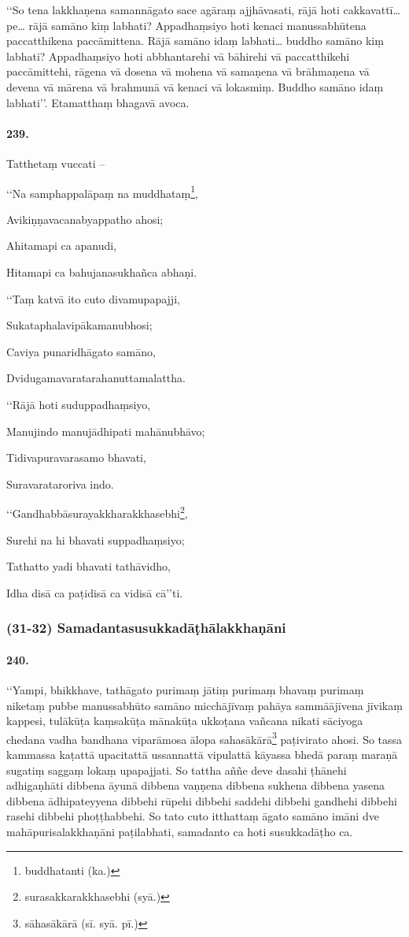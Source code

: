 ‘‘So tena lakkhaṇena samannāgato sace agāraṃ ajjhāvasati, rājā hoti cakkavattī…pe… rājā samāno kiṃ labhati? Appadhaṃsiyo hoti kenaci manussabhūtena paccatthikena paccāmittena. Rājā samāno idaṃ labhati… buddho samāno kiṃ labhati? Appadhaṃsiyo hoti abbhantarehi vā bāhirehi vā paccatthikehi paccāmittehi, rāgena vā dosena vā mohena vā samaṇena vā brāhmaṇena vā devena vā mārena vā brahmunā vā kenaci vā lokasmiṃ. Buddho samāno idaṃ labhati’’. Etamatthaṃ bhagavā avoca.

\paragraph{239.} Tatthetaṃ vuccati –

‘‘Na samphappalāpaṃ na muddhataṃ\footnote{buddhatanti (ka.)},

Avikiṇṇavacanabyappatho ahosi;

Ahitamapi ca apanudi,

Hitamapi ca bahujanasukhañca abhaṇi.

‘‘Taṃ katvā ito cuto divamupapajji,

Sukataphalavipākamanubhosi;

Caviya punaridhāgato samāno,

Dvidugamavaratarahanuttamalattha.

‘‘Rājā hoti suduppadhaṃsiyo,

Manujindo manujādhipati mahānubhāvo;

Tidivapuravarasamo bhavati,

Suravarataroriva indo.

‘‘Gandhabbāsurayakkharakkhasebhi\footnote{surasakkarakkhasebhi (syā.)},

Surehi na hi bhavati suppadhaṃsiyo;

Tathatto yadi bhavati tathāvidho,

Idha disā ca paṭidisā ca vidisā cā’’ti.

\subsubsection{(31-32) Samadantasusukkadāṭhālakkhaṇāni}

\paragraph{240.} ‘‘Yampi, bhikkhave, tathāgato purimaṃ jātiṃ purimaṃ bhavaṃ purimaṃ niketaṃ pubbe manussabhūto samāno micchājīvaṃ pahāya sammāājīvena jīvikaṃ kappesi, tulākūṭa kaṃsakūṭa mānakūṭa ukkoṭana vañcana nikati sāciyoga chedana vadha bandhana viparāmosa ālopa sahasākārā\footnote{sāhasākārā (sī. syā. pī.)} paṭivirato ahosi. So tassa kammassa kaṭattā upacitattā ussannattā vipulattā kāyassa bhedā paraṃ maraṇā sugatiṃ saggaṃ lokaṃ upapajjati. So tattha aññe deve dasahi ṭhānehi adhigaṇhāti dibbena āyunā dibbena vaṇṇena dibbena sukhena dibbena yasena dibbena ādhipateyyena dibbehi rūpehi dibbehi saddehi dibbehi gandhehi dibbehi rasehi dibbehi phoṭṭhabbehi. So tato cuto itthattaṃ āgato samāno imāni dve mahāpurisalakkhaṇāni paṭilabhati, samadanto ca hoti susukkadāṭho ca.

